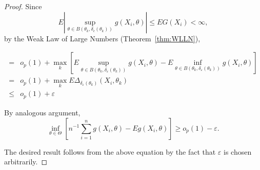 \begin{proof}
	Since
	\begin{equation*}
		E\left|\sup_{\theta\in B\left(\theta_{k},\delta_{c}\left(\theta_{k}\right)\right)}g\left(X_{i},\theta\right)\right|\leq EG\left(X_{i}\right)<\infty,
	\end{equation*}
	by the Weak Law of Large Numbers (Theorem~\ref{thm:WLLN}),

	\begin{equation*}
		\begin{aligned}
			=    & o_{p}(1)+\max_{k}\left[E\sup_{\theta\in B\left(\theta_{k},\delta_{\varepsilon}\left(\theta_{k}\right)\right)}g\left(X_{i},\theta\right)-E\inf_{\theta\in B\left(\theta_{k},\delta_{\varepsilon}\left(\theta_{k}\right)\right)}g\left(X_{i},\theta\right)\right] \\
			=    & o_{p}(1)+\max_{k}E\Delta_{\delta_{\varepsilon}\left(\theta_{k}\right)}\left(X_{i},\theta_{k}\right)                                                                                                                                                             \\
			\leq & o_{p}(1)+\varepsilon
		\end{aligned}
	\end{equation*}

	By analogous argument,
	\begin{equation*}
		\inf_{\theta\in\Theta}\left[n^{-1}\sum_{i=1}^{n}g\left(X_{i},\theta\right)-Eg\left(X_{i},\theta\right)\right]\geq o_{p}(1)-\varepsilon.
	\end{equation*}

	The desired result follows from the above equation by the fact that \(\varepsilon\) is chosen arbitrarily.
\end{proof}
